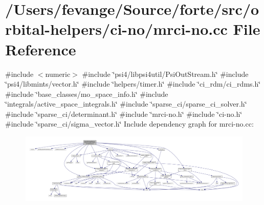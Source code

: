 \hypertarget{mrci-no_8cc}{}\section{/\+Users/fevange/\+Source/forte/src/orbital-\/helpers/ci-\/no/mrci-\/no.cc File Reference}
\label{mrci-no_8cc}
{\ttfamily \#include $<$numeric$>$}\newline
{\ttfamily \#include \char`\"{}psi4/libpsi4util/\+Psi\+Out\+Stream.\+h\char`\"{}}\newline
{\ttfamily \#include \char`\"{}psi4/libmints/vector.\+h\char`\"{}}\newline
{\ttfamily \#include \char`\"{}helpers/timer.\+h\char`\"{}}\newline
{\ttfamily \#include \char`\"{}ci\+\_\+rdm/ci\+\_\+rdms.\+h\char`\"{}}\newline
{\ttfamily \#include \char`\"{}base\+\_\+classes/mo\+\_\+space\+\_\+info.\+h\char`\"{}}\newline
{\ttfamily \#include \char`\"{}integrals/active\+\_\+space\+\_\+integrals.\+h\char`\"{}}\newline
{\ttfamily \#include \char`\"{}sparse\+\_\+ci/sparse\+\_\+ci\+\_\+solver.\+h\char`\"{}}\newline
{\ttfamily \#include \char`\"{}sparse\+\_\+ci/determinant.\+h\char`\"{}}\newline
{\ttfamily \#include \char`\"{}mrci-\/no.\+h\char`\"{}}\newline
{\ttfamily \#include \char`\"{}ci-\/no.\+h\char`\"{}}\newline
{\ttfamily \#include \char`\"{}sparse\+\_\+ci/sigma\+\_\+vector.\+h\char`\"{}}\newline
Include dependency graph for mrci-\/no.cc\+:
\nopagebreak
\begin{figure}[H]
\begin{center}
\leavevmode
\includegraphics[width=350pt]{mrci-no_8cc__incl}
\end{center}
\end{figure}
